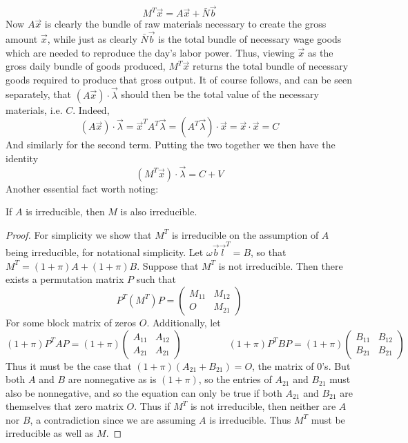 \[  M^T\vec{x} = A\vec{x} + \bar{N}\vec{b} \]
Now $A\vec{x}$ is clearly the bundle of raw materials necessary to create the gross amount $\vec{x}$, while just as clearly $\bar{N}\vec{b}$ is the total bundle of necessary wage goods which are needed to reproduce the day's labor power. Thus, viewing $\vec{x}$ as the gross daily bundle of goods produced, $M^T\vec{x}$ returns the total bundle of necessary goods required to produce that gross output. It of course follows, and can be seen separately, that $(A\vec{x})\cdot\vec{\lambda}$ should then be the total value of the necessary materials, i.e. $C$. Indeed,
\[ (A\vec{x})\cdot\vec{\lambda} = \vec{x}^TA^T\vec{\lambda} = (A^T\vec{\lambda})\cdot\vec{x} = \vec{x} \cdot \vec{x} = C \]
And similarly for the second term. Putting the two together we then have the identity
\[ (M^T\vec{x})\cdot\vec{\lambda} = C+V \]
Another essential fact worth noting:
\begin{fact}
	If $A$ is irreducible, then $M$ is also irreducible. 
\end{fact}
\begin{proof}
	For simplicity we show that $M^T$ is irreducible on the assumption of $A$ being irreducible, for notational simplicity. Let $\omega\vec{b}\vec{l}^T = B$, so that $M^T = (1+\pi)A+(1+\pi)B$. Suppose that $M^T$ is not irreducible. Then there exists a permutation matrix $P$ such that
	\[ P^T(M^T)P = \begin{pmatrix} M_{11} & M_{12} \\ O & M_{21} \end{pmatrix} \]
For some block matrix of zeros $O$. Additionally, let
\[ (1+\pi)P^TAP = (1+\pi)\begin{pmatrix} A_{11} & A_{12} \\ A_{21} & A_{21} \end{pmatrix} \hspace{2cm} (1+\pi)P^TBP = (1+\pi)\begin{pmatrix} B_{11} & B_{12} \\ B_{21} & B_{21} \end{pmatrix} \]
Thus it must be the case that $(1+\pi)(A_{21} + B_{21}) = O$, the matrix of $0$'s. But both $A$ and $B$ are nonnegative as is $(1+\pi)$, so the entries of $A_{21}$ and $B_{21}$ must also be nonnegative, and so the equation can only be true if both $A_{21}$ and $B_{21}$ are themselves that zero matrix $O$. Thus if $M^T$ is not irreducible, then neither are $A$ nor $B$, a contradiction since we are assuming $A$ is irreducible. Thus $M^T$ must be irreducible as well as $M$. 
\end{proof}
